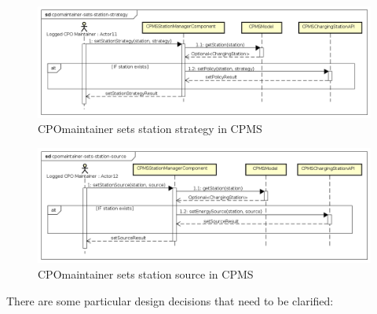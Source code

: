 \begin{figure}[!h]
    \begin{center}
        \includegraphics[keepaspectratio, width=16cm]{Sequence/cpomaintainer-sets-station-strategy.png}
        \caption{\ac{CPO}maintainer sets station strategy in \ac{CPMS}}
        \label{fig:cpomaintainer-sets-station-strategy}
    \end{center}
\end{figure}
\begin{figure}[!h]
    \begin{center}
        \includegraphics[keepaspectratio, width=16cm]{Sequence/cpomaintainer-sets-station-source.png}
        \caption{\ac{CPO}maintainer sets station source in \ac{CPMS}}
        \label{fig:cpomaintainer-sets-station-source}
    \end{center}
\end{figure}
\clearpage
There are some particular design decisions that need to be clarified:
